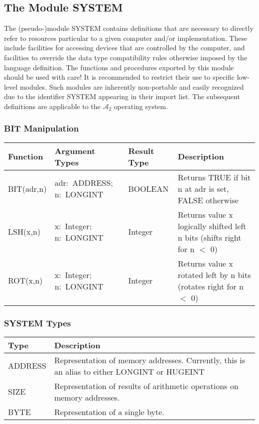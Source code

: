 \documentclass[a4paper,11pt]{article}
\newcommand{\AZ}{\ensuremath{\mathcal{A}_{2}}\xspace}
\begin{document}
\subsection{The Module SYSTEM}
The (pseudo-)module SYSTEM contains definitions that are necessary to directly refer to resources particular to a given computer and/or implementation. These include facilities for accessing devices that are controlled by the computer, and facilities to override the data type compatibility rules otherwise imposed by the language definition. The functions and procedures exported by this module should be used with care! It is recommended to restrict their use to specific low-level modules. Such modules are inherently non-portable and easily recognized due to the identifier SYSTEM appearing in their import list.
The subsequent definitions are applicable to the \AZ operating system.

\subsubsection{BIT Manipulation}
\begin{longtable}{|p{3cm}|v{3cm}|p{2cm}|p{6cm}|}
\hline
Function & Argument Types & Result Type & Description \\
\hline\hline
\endhead
BIT(adr,n) & adr:~ADDRESS; n:~LONGINT & BOOLEAN & Returns TRUE if bit n at adr is set, FALSE otherwise \\
LSH(x,n) & x:~Integer; n:~LONGINT & Integer & Returns value x logically shifted left n bits (shifts right for n $<$ 0) \\
ROT(x,n) & x:~Integer; n:~LONGINT &  Integer & Returns value x rotated left by  n bits (rotates right for n $<$ 0) \\
\hline
\end{longtable}

\newpage
\subsubsection{SYSTEM Types}
\begin{longtable}{|p{3cm}|p{12cm}|}
\hline
Type & Description \\
\hline\hline
\endhead
ADDRESS & Representation of memory addresses. Currently, this is an alias to either LONGINT or HUGEINT \\
SIZE & Representation of results of arithmetic operations on memory addresses.\\
\hline
BYTE & Representation of a single byte.\\
\hline
\end{longtable}
\end{document}
